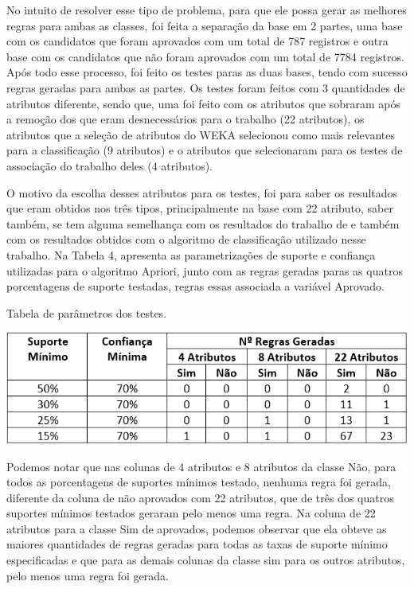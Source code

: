 \par
No intuito de resolver esse tipo de problema, para que ele possa gerar as melhores regras para ambas as classes, foi feita a separação da base em 2 partes, uma base com os candidatos que foram aprovados com um total de 787 registros e outra base com os candidatos que não foram aprovados com um total de 7784 registros. Após todo esse processo, foi feito os testes paras as duas bases, tendo com sucesso regras geradas para ambas as partes. Os testes foram feitos com 3 quantidades de atributos diferente, sendo que, uma foi feito com os atributos que sobraram após a remoção dos que eram desnecessários para o trabalho (22 atributos), os atributos que a seleção de atributos do WEKA selecionou como mais relevantes para a classificação (9 atributos) e o atributos que  selecionaram para os testes de associação do trabalho deles (4 atributos).

\par
O motivo da escolha desses atributos para os testes, foi para saber os resultados que eram obtidos nos três tipos, principalmente na base com 22 atributo, saber também, se tem alguma semelhança com os resultados do trabalho de  e também com os resultados obtidos com o algoritmo de classificação utilizado nesse trabalho. Na Tabela 4, apresenta as parametrizações de suporte e confiança utilizadas para o algoritmo Apriori, junto com as regras geradas paras as quatros porcentagens de suporte testadas, regras essas associada a variável Aprovado.


\par
\begin{table}[!htp]
	\begin{center}
    \caption{\label{fig:waveform_fig} Tabela de parâmetros dos testes.}
	\includegraphics[scale=0.90]{Figuras/Tabela_de_parametros_apriori.png}
	\end{center}
\end{table}

\par
Podemos notar que nas colunas de 4 atributos e 8 atributos da classe Não, para todos as porcentagens de suportes mínimos testado, nenhuma regra foi gerada, diferente da coluna de não aprovados com 22 atributos, que de três dos quatros suportes mínimos testados geraram pelo menos uma regra. Na coluna de 22 atributos para a classe Sim de aprovados, podemos observar que ela obteve as maiores quantidades de regras geradas para todas as taxas de suporte mínimo especificadas e que para as demais colunas da classe sim para os outros atributos, pelo menos uma regra foi gerada.

